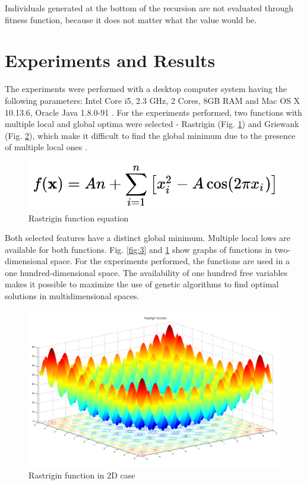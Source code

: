 \documentclass[graybox]{styles/svmult}
\begin{document}
Individuals generated at the bottom of the recursion are not evaluated through fitness function, because it does not matter what the value would be.

\section{Experiments and Results}
\label{sec:3}

The experiments were performed with a desktop computer system having the following parameters: Intel Core i5, 2.3 GHz, 2 Cores, 8GB RAM and Mac OS X 10.13.6, Oracle Java 1.8.0-91 \cite{balabanov-06}. For the experiments performed, two functions with multiple local and global optima were selected - Rastrigin (Fig. \ref{fig:4}) and Griewank (Fig. \ref{fig:5}), which make it difficult to find the global minimum due to the presence of multiple local ones \cite{balabanov-07}.

\begin{figure}[b]
\sidecaption
\includegraphics[width=1.0\textwidth]{images/fig01a}
\caption{Rastrigin function equation}
\label{fig:4}
\end{figure}

Both selected features have a distinct global minimum. Multiple local lows are available for both functions. Fig. \ref{fig:3} and \ref{fig:4} show graphs of functions in two-dimensional space. For the experiments performed, the functions are used in a one hundred-dimensional space. The availability of one hundred free variables makes it possible to maximize the use of genetic algorithms to find optimal solutions in multidimensional spaces.

\begin{figure}[b]
\sidecaption
\includegraphics[width=1.0\textwidth]{images/fig01b}
\caption{Rastrigin function in 2D case}
\label{fig:5}
\end{figure}
\end{document}
